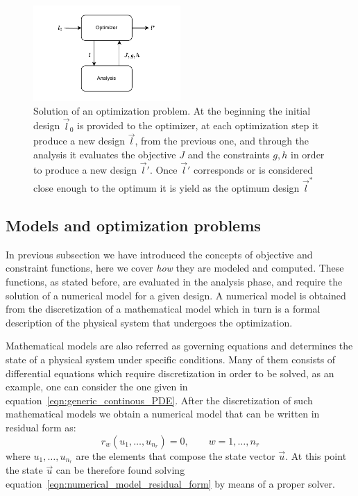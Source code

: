 \begin{figure}
	\centering
	\includegraphics[width=0.5\textwidth]{img/analysis_phase_optimizer.pdf}
	\caption{Solution of an optimization problem. At the beginning the initial design $\vec{l}_0$ is provided to the optimizer, at each optimization step it produce a new design $\vec{l}$, from the previous one, and through the analysis it evaluates the objective $J$ and the constraints $g, h$ in order to produce a new design $\vec{l}'$. Once $\vec{l}'$ corresponds or is considered close enough to the optimum it is yield as the optimum design $\vec{l}^*$}
	\label{fig:analysis_phase_optimizer}
\end{figure}

\subsection{Models and optimization problems}

In previous subsection we have introduced the concepts of objective and constraint functions, here we cover \emph{how} they are modeled and computed. These functions, as stated before, are evaluated in the analysis phase, and require the solution of a numerical model for a given design. A numerical model is obtained from the discretization of a mathematical model which in turn is a formal description of the physical system that undergoes the optimization.

\smallskip
Mathematical models are also referred as governing equations and determines the state of a physical system under specific conditions. Many of them consists of differential equations which require discretization in order to be solved, as an example, one can consider the one given in equation~\eqref{eqn:generic_continous_PDE}. After the discretization of such mathematical models we obtain a numerical model that can be written in residual form as:
\begin{equation}
	\label{eqn:numerical_model_residual_form}
	r_w(u_1, \dots, u_{n_r}) = 0, \qquad w=1, \dots, n_r
\end{equation}
where $u_1, \dots, u_{n_r}$ are the elements that compose the state vector $\vec{u}$.
At this point the state $\vec{u}$ can be therefore found solving equation~\eqref{eqn:numerical_model_residual_form} by means of a proper solver.

